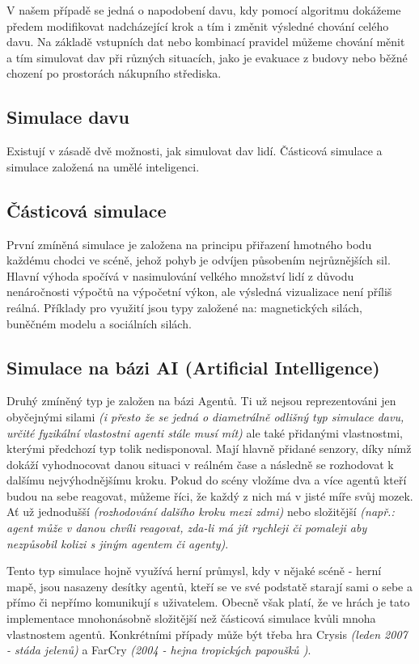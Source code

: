 \documentclass[czech,public,dept460,male,cpdeclaration]{diploma}
\begin{document}
V našem případě se jedná o napodobení davu, kdy pomocí algoritmu dokážeme předem modifikovat nadcházející krok a tím i změnit výsledné chování celého davu. Na základě vstupních dat nebo kombinací pravidel můžeme chování měnit a tím simulovat dav při různých situacích, jako je evakuace z budovy nebo běžné chození po prostorách nákupního střediska.

\subsection{Simulace davu}
Existují v zásadě dvě možnosti, jak simulovat dav lidí. Částicová simulace a simulace založená na umělé inteligenci. \cite{linkToBachelor1}

\subsection{Částicová simulace}
První zmíněná simulace je založena na principu přiřazení hmotného bodu každému chodci ve scéně, jehož pohyb je odvíjen působením nejrůznějších sil. Hlavní výhoda spočívá v nasimulování velkého množství lidí z důvodu nenáročnosti výpočtů na výpočetní výkon, ale výsledná vizualizace není příliš reálná. Příklady pro využití jsou typy založené na: magnetických silách, buněčném modelu a sociálních silách. \cite{linkToBachelor1}

\subsection{Simulace na bázi AI (Artificial Intelligence)}\label{sec:simulace-na-bazi-ai-artificial-intelligence}
Druhý zmíněný typ je založen na bázi Agentů. Ti už nejsou reprezentováni jen obyčejnými silami \textit{(i přesto že se jedná o diametrálně odlišný typ simulace davu, určité fyzikální vlastostni agenti stále musí mít)} ale také přidanými vlastnostmi, kterými předchozí typ tolik nedisponoval. Mají hlavně přidané senzory, díky nímž dokáží vyhodnocovat danou situaci v reálném čase a následně se rozhodovat k dalšímu nejvýhodnějšímu kroku. Pokud do scény vložíme dva a více agentů kteří budou na sebe reagovat, můžeme říci, že každý z nich má v jisté míře svůj mozek. Ať už jednodušší \textit{(rozhodování dalšího kroku mezi zdmi)} nebo složitější \textit{(např.: agent může v danou chvíli reagovat, zda-li má jít rychleji či pomaleji aby nezpůsobil kolizi s jiným agentem či agenty)}.

Tento typ simulace hojně využívá herní průmysl, kdy v nějaké scéně - herní mapě, jsou nasazeny desítky agentů, kteří se ve své podstatě starají sami o sebe a přímo či nepřímo komunikují s uživatelem. Obecně však platí, že ve hrách je tato implementace mnohonásobně složitější než částicová simulace kvůli mnoha vlastnostem agentů. Konkrétními případy může být třeba hra Crysis \textit{(leden 2007 - stáda jelenů)} a FarCry \textit{(2004 - hejna tropických papoušků \cite{linkToCrytek})}.
\end{document}
